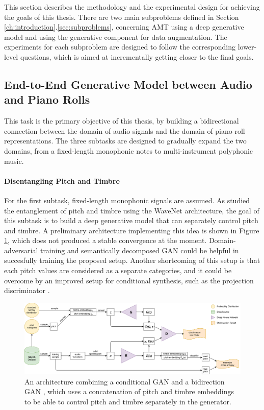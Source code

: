 This section describes the methodology and the experimental design for achieving the goals of this thesis.
There are two main subproblems defined in Section \ref{ch:introduction}.\ref{sec:subproblems}, concerning AMT using a deep generative model and using the generative component for data augmentation.
The experiments for each subproblem are designed to follow the corresponding lower-level questions, which is aimed at incrementally getting closer to the final goals.

\subsection{End-to-End Generative Model between Audio and Piano Rolls}

This task is the primary objective of this thesis, by building a bidirectional connection between the domain of audio signals and the domain of piano roll representations.
The three subtasks are designed to gradually expand the two domains, from a fixed-length monophonic notes to multi-instrument polyphonic music.

\paragraph{Disentangling Pitch and Timbre}\mbox{}

For the first subtask, fixed-length monophonic signals are assumed.
As  studied the entanglement of pitch and timbre using the WaveNet architecture, the goal of this subtask is to build a deep generative model that can separately control pitch and timbre.
A preliminary architecture implementing this idea is shown in Figure \ref{fig:pegan}, which does not produced a stable convergence at the moment.
Domain-adversarial training \cite{ganin2015domain} and semantically decomposed GAN \cite{donahue2017gan} could be helpful in succesfully training the proposed setup.
Another shortcoming of this setup is that each pitch values are considered as a separate categories, and it could be overcome by an improved setup for conditional synthesis, such as the projection discriminator \cite{miyato2018cgan}.

\begin{figure}
	\includegraphics[width=\textwidth]{PEGAN.pdf}
	\caption{An architecture combining a conditional GAN \protect\cite{mirza2014conditional} and a bidirection GAN \protect\cite{donahue2016bigan}, which uses a concatenation of pitch and timbre embeddings to be able to control pitch and timbre separately in the generator.}
	\label{fig:pegan}
\end{figure}

